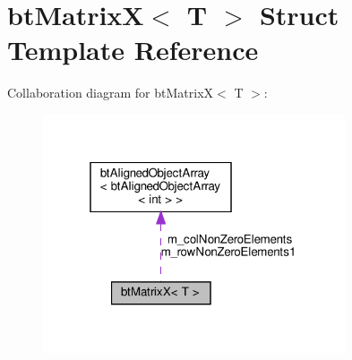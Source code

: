 \hypertarget{structbtMatrixX}{}\section{bt\+MatrixX$<$ T $>$ Struct Template Reference}
\label{structbtMatrixX}


Collaboration diagram for bt\+MatrixX$<$ T $>$\+:
\nopagebreak
\begin{figure}[H]
\begin{center}
\leavevmode
\includegraphics[width=253pt]{structbtMatrixX__coll__graph}
\end{center}
\end{figure}
